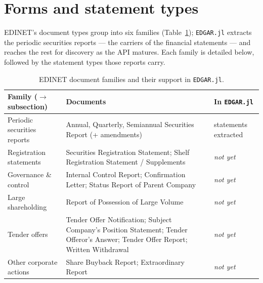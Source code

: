 \documentclass[11pt,a4paper]{report}
\begin{document}
\section{Forms and statement types}\label{sec:edinet-forms}

EDINET's document types group into six families (Table~\ref{tab:edinet-forms}); \texttt{EDGAR.jl} extracts
the periodic securities reports --- the carriers of the financial statements --- and reaches the rest for
discovery as the API matures. Each family is detailed below, followed by the statement types those reports
carry.

\begin{table}[h]
\centering
\small
\caption{EDINET document families and their support in \texttt{EDGAR.jl}.}
\label{tab:edinet-forms}
\begin{tabular}{@{}p{}p{}p{}@{}}
\toprule
\textbf{Family ($\to$ subsection)} & \textbf{Documents} & \textbf{In \texttt{EDGAR.jl}} \\
\midrule
Periodic securities reports & Annual, Quarterly, Semiannual Securities Report (+ amendments) & statements extracted \\
Registration statements & Securities Registration Statement; Shelf Registration Statement / Supplements & \emph{not yet} \\
Governance \& control & Internal Control Report; Confirmation Letter; Status Report of Parent Company & \emph{not yet} \\
Large shareholding & Report of Possession of Large Volume & \emph{not yet} \\
Tender offers & Tender Offer Notification; Subject Company's Position Statement; Tender Offeror's Answer; Tender Offer Report; Written Withdrawal & \emph{not yet} \\
Other corporate actions & Share Buyback Report; Extraordinary Report & \emph{not yet} \\
\bottomrule
\end{tabular}
\end{table}
\end{document}
